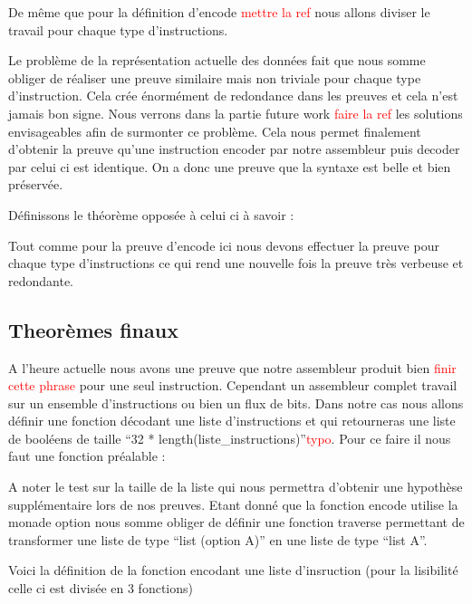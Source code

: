 \documentclass {article}
\newcommand{\codefrom}[3]
           {}
\theoremstyle{definition}
\theoremstyle{remark}
\newcommand{\todo}[1]{\textcolor{red}{#1}}
\begin{document}
De même que pour la définition d'encode \todo{mettre la ref} nous allons diviser le travail pour chaque
type d'instructions.

\codefrom{src}{encodeProof}{encode_decode_t_n}

Le problème de la représentation actuelle des données fait que nous somme obliger de réaliser une preuve
similaire mais non triviale pour chaque type d'instruction. Cela crée énormément de redondance dans les preuves
et cela n'est jamais bon signe. Nous verrons dans la partie future work \todo{faire la ref} les solutions envisageables afin
de surmonter ce problème.
Cela nous permet finalement d'obtenir la preuve qu'une instruction encoder par notre assembleur puis decoder par celui
ci est identique. On a donc une preuve que la syntaxe est belle et bien préservée.

Définissons le théorème opposée à celui ci à savoir :

\codefrom{src}{encodeProof}{decode_encode}

Tout comme pour la preuve d'encode ici nous devons effectuer la preuve pour chaque type d'instructions
ce qui rend une nouvelle fois la preuve très verbeuse et redondante. 




\subsection{Theorèmes finaux}

A l'heure actuelle nous avons une preuve que notre assembleur produit bien \todo{finir cette phrase}
pour une seul instruction. Cependant un assembleur complet travail sur un ensemble d'instructions
ou bien un flux de bits. Dans notre cas nous allons définir une fonction décodant une liste d'instructions et qui
retourneras une liste de booléens de taille ``32 * length(liste\_instructions)''\todo{typo}.
Pour ce faire il nous faut une fonction préalable :

\codefrom{src}{encode}{concat_listes_32}

A noter le test sur la taille de la liste
qui nous permettra d'obtenir une hypothèse supplémentaire lors de nos preuves.
Etant donné que la fonction encode utilise la monade option nous somme obliger de définir une fonction
traverse permettant de transformer une liste de type ``list (option A)'' en une liste de type ``list A''.

\codefrom{src}{encode}{traverse}

Voici la définition de la fonction encodant une liste d'insruction (pour la lisibilité celle ci est
divisée en 3 fonctions)
\end{document}
